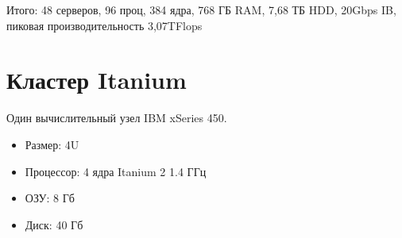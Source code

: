 \documentclass[a4paper,8pt]{extreport}
\begin{document}
Итого: 48 серверов, 96 проц, 384 ядра, 768 ГБ RAM, 7,68 ТБ HDD, 20Gbps IB, пиковая производительность 3,07TFlops


\section{Кластер Itanium}
Один вычислительный узел IBM xSeries 450.
\begin{itemize}
  \item Размер: 4U
  \item Процессор: 4 ядра Itanium 2 1.4 ГГц
  \item ОЗУ: 8 Гб
  \item Диск: 40 Гб
\end{itemize}
\end{document}
